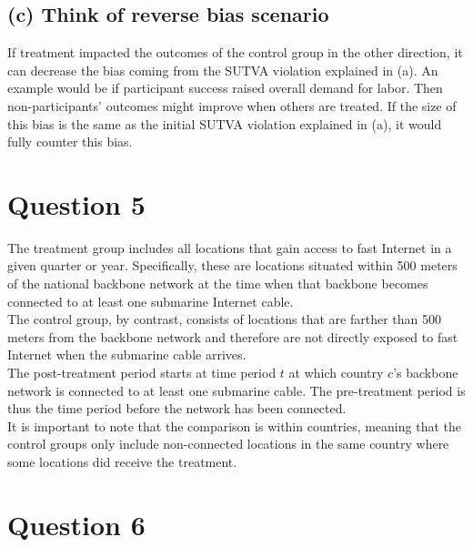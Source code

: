\documentclass{scrartcl}
\begin{document}
\subsection*{(c) Think of reverse bias scenario}

If treatment impacted the outcomes of the control group in the other direction, it can decrease the bias coming from the SUTVA violation explained in (a). An example would be if participant success raised overall demand for labor. Then non-participants’ outcomes might improve when others are treated. If the size of this bias is the same as the initial SUTVA violation explained in (a), it would fully counter this bias.

\section*{Question 5}


The treatment group includes all locations that gain access to fast Internet in a given quarter or year. Specifically, these are locations situated within 500 meters of the national backbone network at the time when that backbone becomes connected to at least one submarine Internet cable. \\
The control group, by contrast, consists of locations that are farther than 500 meters from the backbone network and therefore are not directly exposed to fast Internet when the submarine cable arrives.\\

The post-treatment period starts at time period $t$ at which country $c$'s backbone network is connected to at least one submarine cable. The pre-treatment period is thus the time period before the network has been connected. \\

It is important to note that the comparison is within countries, meaning that the control groups only include non-connected locations in the same country where some locations did receive the treatment.   

\section*{Question 6}
\end{document}
